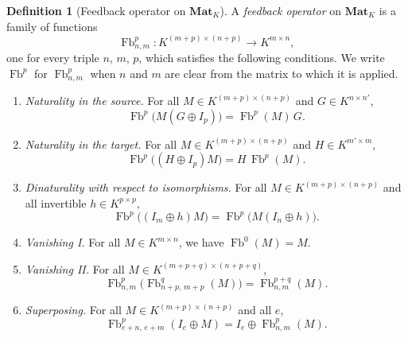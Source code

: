 \documentclass[11pt,a4paper]{article}
\theoremstyle{plain}
\theoremstyle{definition}
\newtheorem{definition}[theorem]{Definition}
\theoremstyle{remark}
\DeclareMathOperator{\Fb}{Fb}
\newcommand{\Mat}{\mathbf{Mat}}
\begin{document}
\begin{definition}[Feedback operator on $\Mat_K$]
    \label{def:fb-mat}
    A \emph{feedback operator} on $\Mat_K$ is a family of functions
    \begin{equation}
        \Fb^p_{n,m} \colon K^{(m+p) \times (n+p)} \to K^{m \times n},
    \end{equation}
    one for every triple $n$, $m$, $p$, which satisfies the following conditions.
    We write $\Fb^p$ for $\Fb^p_{n,m}$ when $n$ and $m$ are clear from the matrix to which it is applied.
    \begin{enumerate}[label=\textup{(F\arabic*)}, leftmargin=*]
        \item \emph{Naturality in the source.}
              For all $M \in K^{(m+p) \times (n+p)}$ and $G \in K^{n \times n'}$,
              \begin{equation*}
                  \Fb^p\bigl( M (G \oplus I_p) \bigr) = \Fb^p(M)\, G .
              \end{equation*}
        \item \emph{Naturality in the target.}
              For all $M \in K^{(m+p) \times (n+p)}$ and $H \in K^{m' \times m}$,
              \begin{equation*}
                  \Fb^p\bigl( (H \oplus I_p) M \bigr) = H\, \Fb^p(M) .
              \end{equation*}
        \item \emph{Dinaturality with respect to isomorphisms.}
              For all $M \in K^{(m+p) \times (n+p)}$ and all invertible $h \in K^{p \times p}$,
              \begin{equation*}
                  \Fb^p\bigl( (I_m \oplus h) M \bigr) = \Fb^p\bigl( M (I_n \oplus h) \bigr) .
              \end{equation*}
        \item \emph{Vanishing I.}
              For all $M \in K^{m \times n}$, we have $\Fb^0(M) = M$.
        \item \emph{Vanishing II.}
              For all $M \in K^{(m+p+q) \times (n+p+q)}$,
              \begin{equation*}
                  \Fb^p_{n,m}\bigl( \Fb^q_{n+p,\,m+p}(M) \bigr) = \Fb^{p+q}_{n,m}(M) .
              \end{equation*}
        \item \emph{Superposing.}
              For all $M \in K^{(m+p) \times (n+p)}$ and all $e$,
              \begin{equation*}
                  \Fb^p_{e+n,\,e+m}( I_e \oplus M ) = I_e \oplus \Fb^p_{n,m}(M) .
              \end{equation*}
    \end{enumerate}
\end{definition}
\end{document}
